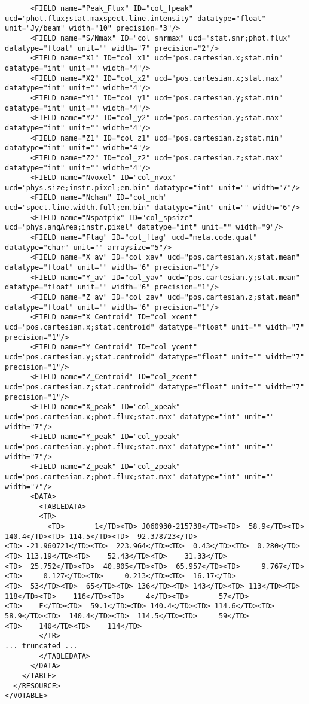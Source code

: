 {\begin{verbatim}
      <FIELD name="Peak_Flux" ID="col_fpeak" ucd="phot.flux;stat.maxspect.line.intensity" datatype="float" unit="Jy/beam" width="10" precision="3"/>
      <FIELD name="S/Nmax" ID="col_snrmax" ucd="stat.snr;phot.flux" datatype="float" unit="" width="7" precision="2"/>
      <FIELD name="X1" ID="col_x1" ucd="pos.cartesian.x;stat.min" datatype="int" unit="" width="4"/>
      <FIELD name="X2" ID="col_x2" ucd="pos.cartesian.x;stat.max" datatype="int" unit="" width="4"/>
      <FIELD name="Y1" ID="col_y1" ucd="pos.cartesian.y;stat.min" datatype="int" unit="" width="4"/>
      <FIELD name="Y2" ID="col_y2" ucd="pos.cartesian.y;stat.max" datatype="int" unit="" width="4"/>
      <FIELD name="Z1" ID="col_z1" ucd="pos.cartesian.z;stat.min" datatype="int" unit="" width="4"/>
      <FIELD name="Z2" ID="col_z2" ucd="pos.cartesian.z;stat.max" datatype="int" unit="" width="4"/>
      <FIELD name="Nvoxel" ID="col_nvox" ucd="phys.size;instr.pixel;em.bin" datatype="int" unit="" width="7"/>
      <FIELD name="Nchan" ID="col_nch" ucd="spect.line.width.full;em.bin" datatype="int" unit="" width="6"/>
      <FIELD name="Nspatpix" ID="col_spsize" ucd="phys.angArea;instr.pixel" datatype="int" unit="" width="9"/>
      <FIELD name="Flag" ID="col_flag" ucd="meta.code.qual" datatype="char" unit="" arraysize="5"/>
      <FIELD name="X_av" ID="col_xav" ucd="pos.cartesian.x;stat.mean" datatype="float" unit="" width="6" precision="1"/>
      <FIELD name="Y_av" ID="col_yav" ucd="pos.cartesian.y;stat.mean" datatype="float" unit="" width="6" precision="1"/>
      <FIELD name="Z_av" ID="col_zav" ucd="pos.cartesian.z;stat.mean" datatype="float" unit="" width="6" precision="1"/>
      <FIELD name="X_Centroid" ID="col_xcent" ucd="pos.cartesian.x;stat.centroid" datatype="float" unit="" width="7" precision="1"/>
      <FIELD name="Y_Centroid" ID="col_ycent" ucd="pos.cartesian.y;stat.centroid" datatype="float" unit="" width="7" precision="1"/>
      <FIELD name="Z_Centroid" ID="col_zcent" ucd="pos.cartesian.z;stat.centroid" datatype="float" unit="" width="7" precision="1"/>
      <FIELD name="X_peak" ID="col_xpeak" ucd="pos.cartesian.x;phot.flux;stat.max" datatype="int" unit="" width="7"/>
      <FIELD name="Y_peak" ID="col_ypeak" ucd="pos.cartesian.y;phot.flux;stat.max" datatype="int" unit="" width="7"/>
      <FIELD name="Z_peak" ID="col_zpeak" ucd="pos.cartesian.z;phot.flux;stat.max" datatype="int" unit="" width="7"/>
      <DATA>
        <TABLEDATA>
        <TR>
          <TD>       1</TD><TD> J060930-215738</TD><TD>  58.9</TD><TD> 140.4</TD><TD> 114.5</TD><TD>  92.378723</TD>
<TD> -21.960721</TD><TD>  223.964</TD><TD>  0.43</TD><TD>  0.280</TD><TD> 113.19</TD><TD>    52.43</TD><TD>    31.33</TD>
<TD>  25.752</TD><TD>  40.905</TD><TD>  65.957</TD><TD>     9.767</TD><TD>     0.127</TD><TD>     0.213</TD><TD>  16.17</TD>
<TD>  53</TD><TD>  65</TD><TD> 136</TD><TD> 143</TD><TD> 113</TD><TD> 118</TD><TD>    116</TD><TD>     4</TD><TD>       57</TD>
<TD>    F</TD><TD>  59.1</TD><TD> 140.4</TD><TD> 114.6</TD><TD>   58.9</TD><TD>  140.4</TD><TD>  114.5</TD><TD>     59</TD>
<TD>    140</TD><TD>    114</TD>
        </TR>
... truncated ...
        </TABLEDATA>
      </DATA>
    </TABLE>
  </RESOURCE>
</VOTABLE>
\end{verbatim}
}

